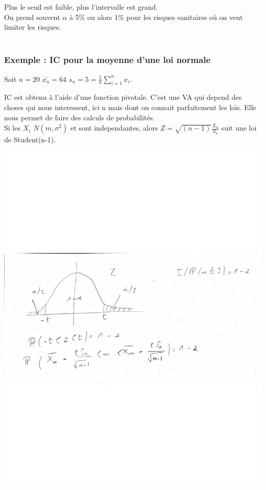 \documentclass[11pt]{article}
\begin{document}
Plus le seuil est faible, plus l'intervalle est grand.\\
On prend souvent $\alpha$ à 5\% ou alors 1\% pour les risques sanitaires où on veut limiter les risques.\\

\
\subsubsection{Exemple : IC pour la moyenne d'une loi normale}
Soit $n=20$  $\bar{x_{n}}=64$  $s_{n}=5=\frac{1}{n}\sum_{i=1}^{n}x_{i}$.

IC est obtenu à l'aide d'une fonction pivotale.
C'est une VA qui depend des choses qui nous interessent, ici n mais dont on connait parfaitement les lois. Elle nous permet de faire des calculs de probabilités.\\

Si les $X_{i}$ $N(m,\sigma^{2})$ et sont independantes, alors $Z=\sqrt{(n-1)}\frac{\bar{X_{n}}}{S_{n}}$  suit une loi de Student(n-1).

\centerline{\includegraphics[scale=0.6]{img/ic.pdf}}
\end{document}
